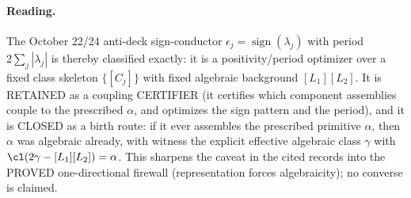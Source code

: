 \documentclass[11pt]{article}
\begin{document}
\paragraph{Reading.}
The October 22/24 anti-deck sign-conductor
$\epsilon_j=\operatorname{sign}(\lambda_j)$ with period
$2\sum_j|\lambda_j|$ is thereby classified exactly: it is a
positivity/period optimizer over a fixed class skeleton
$\{[C_j]\}$ with fixed algebraic background $[L_1][L_2]$. It is
RETAINED as a coupling CERTIFIER (it certifies which component
assemblies couple to the prescribed $\alpha$, and optimizes the sign
pattern and the period), and it is CLOSED as a birth route: if it ever
assembles the prescribed primitive $\alpha$, then $\alpha$ was
algebraic already, with witness the explicit effective algebraic class
$\gamma$ with $\cl(2\gamma-[L_1][L_2])=\alpha$. This sharpens the
caveat in the cited records into the PROVED one-directional firewall
(representation forces algebraicity); no converse is claimed.
\end{document}
